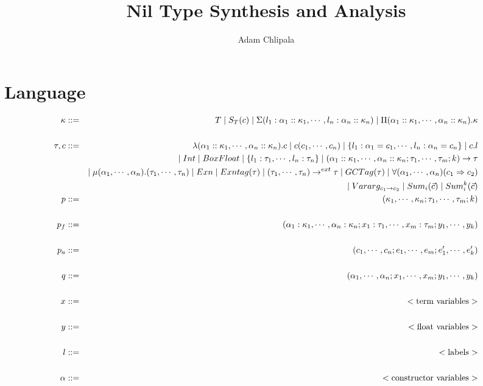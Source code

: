 \documentclass{article}
\title{Nil Type Synthesis and Analysis}
\author{Adam Chlipala}
\begin{document}
\maketitle

\section{Language}

\begin{eqnarray*}
	\kappa &::=& T \mid S_T(c) \mid \DRecord{l_1:\alpha_1::\kappa_1, \cdots, l_n:\alpha_n::\kappa_n} \mid \DArrow{\alpha_1::\kappa_1, \cdots, \alpha_n::\kappa_n}{\kappa} \\
	\\
	\tau, c &::=& \CFn{\alpha_1::\kappa_1,\cdots,\alpha_n::\kappa_n}{c} \mid \CApp{c}{c_1,\cdots,c_n} \mid \CRecord{l_1: \alpha_1 = c_1, \cdots, l_n: \alpha_n = c_n} \mid \CSelect{c}{l} \\
	&& \mid \TInt \mid \BoxFloat \mid \Record{l_1: \tau_1,\cdots,l_n: \tau_n} \mid \Arrow{\alpha_1::\kappa_1,\cdots,\alpha_n::\kappa_n}{\tau_1,\cdots,\tau_m}{k}{\tau} \\
	&& \mid \Rec{\alpha_1,\cdots,\alpha_n}{\tau_1,\cdots,\tau_n} \mid \Exn \mid \Exntag{\tau} \mid \ExternArrow{\tau_1,\cdots,\tau_n}{\tau} \mid \GCTag{\tau} \mid \Coercion{\alpha_1,\cdots,\alpha_n}{c_1}{c_2} \\
	&& \mid \Vararg{c_1}{c_2} \mid \Sum{i}{\vec c} \mid \KSum{i}{\vec c}{k}
	\\
	p &::=& (\kappa_1,\cdots,\kappa_n; \tau_1,\cdots,\tau_m; k) \\
	\\
	p_f &::=& (\alpha_1: \kappa_1,\cdots,\alpha_n: \kappa_n; x_1: \tau_1,\cdots,x_m: \tau_m; y_1, \cdots, y_k) \\
	\\
	p_a &::=& (c_1, \cdots, c_n; e_1, \cdots, e_m; e'_1, \cdots, e'_k) \\
	\\
	q &::=& (\alpha_1, \cdots, \alpha_n; x_1, \cdots, x_m; y_1, \cdots, y_k) \\
	\\
	x &::=& <\textrm{term variables}> \\
	\\
	y &::=& <\textrm{float variables}> \\
	\\
	l &::=& <\textrm{labels}> \\
	\\
	\alpha &::=& <\textrm{constructor variables}> \\

\end{eqnarray*}
\end{document}
